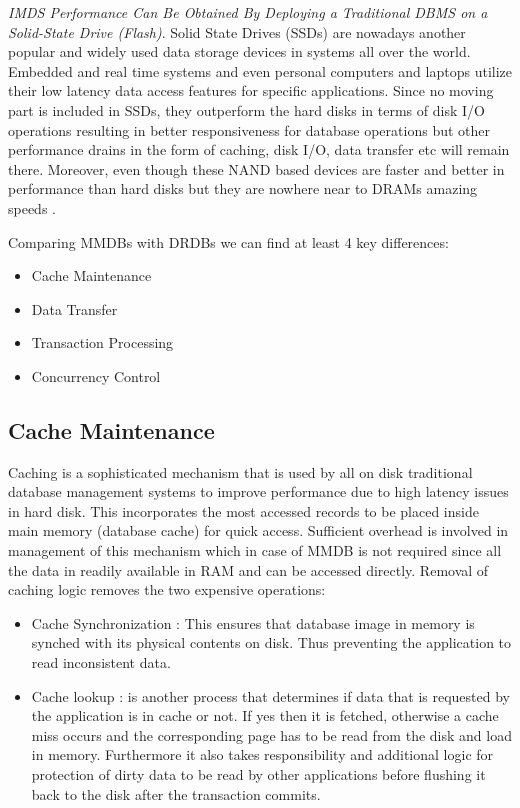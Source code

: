 \documentclass[10pt]{article} %
\begin{document}
\emph{ IMDS Performance Can Be Obtained By Deploying a Traditional DBMS on a Solid-State Drive (Flash)}. Solid State Drives (SSDs) are nowadays another popular and widely used data storage devices in systems all over the world. Embedded and real time systems and even personal computers and laptops utilize their low latency data access features for specific applications. Since no moving part is included in SSDs, they outperform the hard disks in terms of disk I/O operations resulting in better responsiveness for database operations \cite{Mcobject-Myths} but other performance drains in the form of caching, disk I/O, data transfer etc will remain there. Moreover, even though these NAND based devices are faster and better in performance than hard disks but they are nowhere near to DRAMs amazing speeds \cite{ssds}. 

Comparing MMDBs with DRDBs we can find at least 4 key differences:

\begin{itemize}
\item Cache Maintenance
\item Data Transfer
\item Transaction Processing
\item Concurrency Control 
\end{itemize}

\subsection{Cache Maintenance}
Caching is a sophisticated mechanism that is used by all on disk traditional database management systems to improve performance due to high latency issues in hard disk. This incorporates the most accessed records to be placed inside main memory (database cache) for quick access. Sufficient overhead is involved in management of this mechanism which in case of MMDB is not required since all the data in readily available in RAM and can be accessed directly. Removal of caching logic removes the two expensive operations:

\begin{itemize}
\item Cache Synchronization : This ensures that database image in memory is synched with its physical contents on disk. Thus preventing the application to read inconsistent data. 

\item Cache lookup : is another process that determines if data that is requested by the application is in cache or not. If yes then it is fetched, otherwise a cache miss occurs and the corresponding page has to be read from the disk and load in memory. Furthermore it also takes responsibility and additional logic for protection of dirty data to be read by other applications before flushing it back to the disk after the transaction commits.
\end{itemize}
\end{document}
